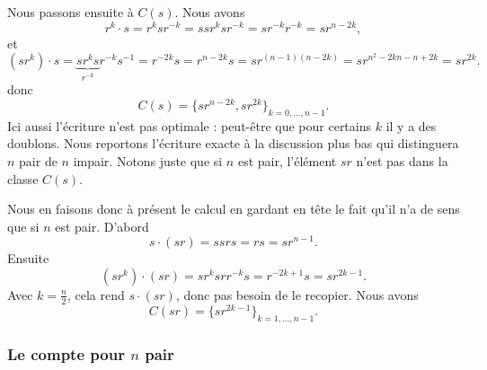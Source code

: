 Nous passons ensuite à \( C(s)\). Nous avons
\begin{equation}
	r^k\cdot s=r^ksr^{-k}=ssr^ksr^{-k}=sr^{-k}r^{-k}=sr^{n-2k},
\end{equation}
et
\begin{equation}
	(sr^k)\cdot s=\underbrace{sr^ks}_{r^{-k}}r^{-k}s^{-1}=r^{-2k}s=r^{n-2k}s=sr^{(n-1)(n-2k)}=sr^{n^2-2kn-n+2k}=sr^{2k}.
\end{equation}
donc
\begin{equation}
	C(s)=\{ sr^{n-2k},sr^{2k} \}_{k=0,\ldots, n-1}.
\end{equation}
Ici aussi l'écriture n'est pas optimale : peut-être que pour certains \( k\) il y a des doublons. Nous reportons l'écriture exacte à la discussion plus bas qui distinguera \( n\) pair de \( n\) impair. Notons juste que si \( n\) est pair, l'élément \( sr\) n'est pas dans la classe \( C(s)\).

Nous en faisons donc à présent le calcul en gardant en tête le fait qu'il n'a de sens que si \( n\) est pair. D'abord
\begin{equation}
	s\cdot (sr)=ssrs=rs=sr^{n-1}.
\end{equation}
Ensuite
\begin{equation}
	(sr^k)\cdot (sr)=sr^ksrr^{-k}s=r^{-2k+1}s=sr^{2k-1}.
\end{equation}
Avec \( k=\frac{ n }{2}\), cela rend \( s\cdot (sr)\), donc pas besoin de le recopier. Nous avons
\begin{equation}
	C(sr)=\{ sr^{2k-1} \}_{k=1,\ldots, n-1}.
\end{equation}

\subsubsection{Le compte pour $ n$ pair}
\label{SubsubsecROVmHuM}


